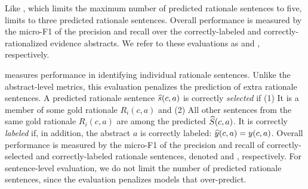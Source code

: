 Like \fever, which limits the maximum number of predicted rationale sentences to five, \ours limits to three predicted rationale sentences. Overall performance is measured by the micro-F1 of the precision and recall over the correctly-labeled and correctly-rationalized evidence abstracts. We refer to these evaluations as \abstractLabelOnly and \abstractLabelRationale, respectively.

\vspace{.2cm}  measures performance in identifying individual rationale sentences. Unlike the abstract-level metrics, this evaluation penalizes the prediction of extra rationale sentences. A predicted rationale sentence $\widehat{s}(c, a)$ is correctly \emph{selected} if (1) It is a member of some gold rationale $R_i(c, a)$ and (2) All other sentences from the same gold rationale $R_i(c, a)$ are among the predicted $\widehat{S}(c, a)$. It is correctly \emph{labeled} if, in addition, the abstract $a$ is correctly labeled: $\widehat{y}(c, a) = y(c, a)$. Overall performance is measured by the micro-F1 of the precision and recall of correctly-selected and correctly-labeled rationale sentences, denoted \sentenceSelectionOnly and \sentenceSelectionLabel, respectively. For sentence-level evaluation, we do not limit the number of predicted rationale sentences, since the evaluation penalizes models that over-predict.
